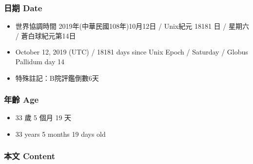 \documentclass[a5paper, 12pt
]{book}
\providecommand{\tightlist}{%
  \setlength{\itemsep}{0pt}\setlength{\parskip}{0pt}}
\begin{document}
\hypertarget{ux65e5ux671f-date-11}{%
\subsubsection{日期 Date}\label{ux65e5ux671f-date-11}}

\begin{itemize}
\tightlist
\item
  世界協調時間 2019年(中華民國108年)10月12日 / Unix紀元 18181 日 /
  星期六 / 蒼白球紀元第14日
\item
  October 12, 2019 (UTC) / 18181 days since Unix Epoch / Saturday /
  Globus Pallidum day 14
\item
  特殊註記：B院評鑑倒數6天
\end{itemize}

\hypertarget{ux5e74ux9f61-age-11}{%
\subsubsection{年齡 Age}\label{ux5e74ux9f61-age-11}}

\begin{itemize}
\tightlist
\item
  33 歲 5 個月 19 天
\item
  33 years 5 months 19 days old
\end{itemize}

\hypertarget{ux672cux6587-content-11}{%
\subsubsection{本文 Content}\label{ux672cux6587-content-11}}
\end{document}
